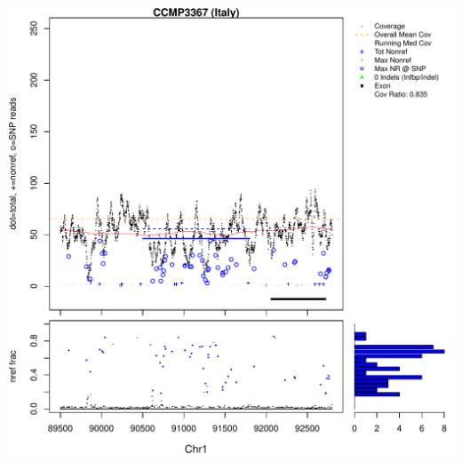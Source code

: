 \documentclass{article}\usepackage[]{graphicx}\usepackage[]{color}
\makeatletter
\def\maxwidth{ %
  \ifdim\Gin@nat@width>\linewidth
    \linewidth
  \else
    \Gin@nat@width
  \fi
}
\newenvironment{knitrout}{}{} %
\makeatother
\begin{document}
\begin{knitrout}
{\includegraphics[width=\maxwidth]{figs-knitr/unnamed-chunk-47-7} 

}



\end{knitrout}
\end{document}
